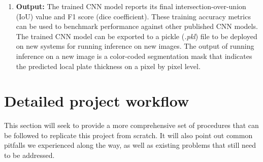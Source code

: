 \documentclass[11pt,letterpaper]{article}
\begin{document}
\begin{enumerate}
		\item \textbf{Output:} The trained CNN model reports its final intersection-over-union (IoU) value and F1 score (dice coefficient). These training accuracy metrics can be used to benchmark performance against other published CNN models. The trained CNN model can be exported to a pickle (\textit{.pkl}) file to be deployed on new systems for running inference on new images. The output of running inference on a new image is a color-coded segmentation mask that indicates the predicted local plate thickness on a pixel by pixel level.
	\end{enumerate}
	
	\section{Detailed project workflow}
	This section will seek to provide a more comprehensive set of procedures that can be followed to replicate this project from scratch. It will also point out common pitfalls we experienced along the way, as well as existing problems that still need to be addressed.
\end{document}

